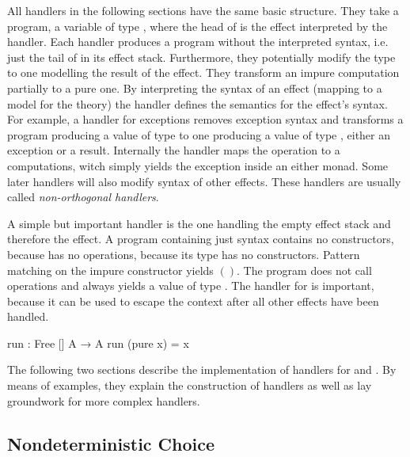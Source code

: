 All handlers in the following sections have the same basic structure.
They take a program, a variable of type
\AgdaSpace{}\AgdaSpace{},
where the head of  is the effect interpreted by the handler.
Each handler produces a program without the interpreted syntax, i.e. just the
tail of  in its effect stack.
Furthermore, they potentially modify the type  to one modelling
the result of the effect.
They transform an impure computation partially to a pure one.
By interpreting the syntax of an effect (mapping to a model for the theory) the
handler defines the semantics for the effect's syntax.
For example, a handler for exceptions removes exception syntax and transforms a
program producing a value of type  to one producing a value of
type
\AgdaSpace{}\AgdaSpace{},
either an exception or a result.
Internally the handler maps the 
 operation to a 
computations, witch simply yields the exception inside an either monad.
Some later handlers will also modify syntax of other effects.
These handlers are usually called \textit{non-orthogonal handlers}.

A simple but important handler is the one handling the empty effect stack and
therefore the  effect.
A program containing just  syntax contains no
 constructors, because  has
no operations, because its  type has no constructors.
Pattern matching on the impure constructor yields $()$.
The program does not call  operations and
always yields a value of type .
The handler for  is important, because it can be used to
escape the  context after all other effects have been
handled.

\begin{code}
run : Free [] A → A
run (pure x) = x
\end{code}
The following two sections describe the implementation of handlers for
 and .
By means of examples, they explain the construction of handlers as well as
lay groundwork for more complex handlers.


\subsection{Nondeterministic Choice}
\label{nondeterminism}

